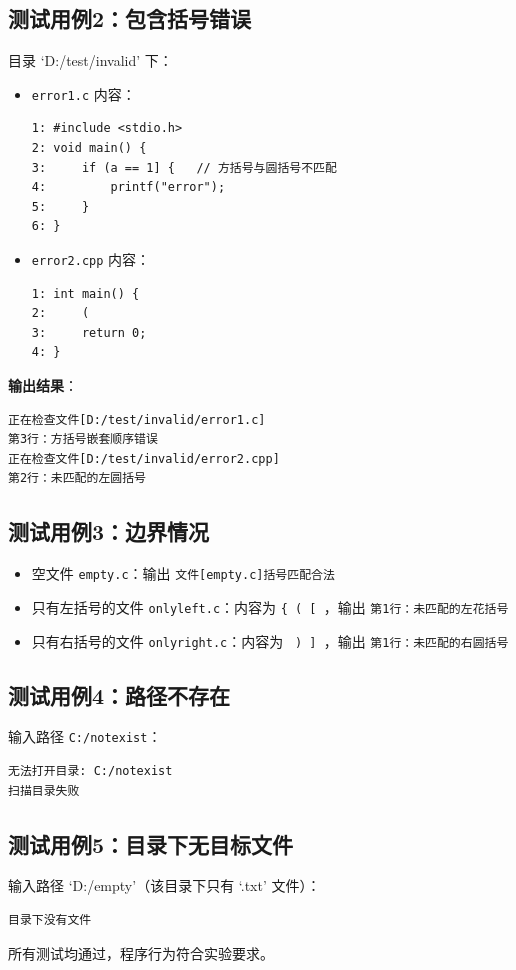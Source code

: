 \documentclass[UTF8]{ctexart}
\begin{document}
\subsection{测试用例2：包含括号错误}
目录 ‘D:/test/invalid’ 下：
\begin{itemize}
    \item \texttt{error1.c} 内容：
\begin{lstlisting}
1: #include <stdio.h>
2: void main() {
3:     if (a == 1] {   // 方括号与圆括号不匹配
4:         printf("error");
5:     }
6: }
\end{lstlisting}
    \item \texttt{error2.cpp} 内容：
\begin{lstlisting}
1: int main() {
2:     (
3:     return 0;
4: }
\end{lstlisting}
\end{itemize}
\textbf{输出结果}：
\begin{verbatim}
正在检查文件[D:/test/invalid/error1.c]
第3行：方括号嵌套顺序错误
正在检查文件[D:/test/invalid/error2.cpp]
第2行：未匹配的左圆括号
\end{verbatim}

\subsection{测试用例3：边界情况}
\begin{itemize}
    \item 空文件 \texttt{empty.c}：输出 \texttt{文件[empty.c]括号匹配合法}
    \item 只有左括号的文件 \texttt{onlyleft.c}：内容为 \texttt{\{ ( [ }，输出 \texttt{第1行：未匹配的左花括号}
    \item 只有右括号的文件 \texttt{onlyright.c}：内容为 \texttt{ ) ] }，输出 \texttt{第1行：未匹配的右圆括号}
\end{itemize}

\subsection{测试用例4：路径不存在}
输入路径 \texttt{C:/notexist}：
\begin{verbatim}
无法打开目录: C:/notexist
扫描目录失败
\end{verbatim}

\subsection{测试用例5：目录下无目标文件}
输入路径 ‘D:/empty’（该目录下只有 ‘.txt’ 文件）：
\begin{verbatim}
目录下没有文件
\end{verbatim}

所有测试均通过，程序行为符合实验要求。
\end{document}
